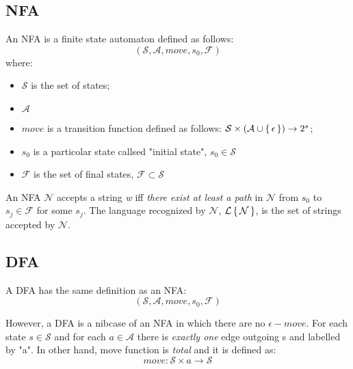 \subsection{NFA}

An NFA is a finite state automaton defined as follows:
\begin{equation}
(\mathcal{S} , \mathcal{A} , move , s_0 , \mathcal{F})
\end{equation}
where:
\begin{itemize}
\item $\mathcal{S}$ is the set of states;
\item $\mathcal{A}$
\item $move$ is a transition function defined as follows: $\mathcal{S} \times (\mathcal{A}\cup \set{\epsilon} ) \rightarrow 2^s$;
\item $s_0$ is a particolar state callsed "initial state", $s_0 \in \mathcal{S}$
\item $\mathcal{F}$ is the set of final states, $\mathcal{F} \subset \mathcal{S}$
\end{itemize}
\newline
An NFA $\mathcal{N}$ accepts a string \textit{w} iff \textit{there exist at least a path} in $\mathcal{N}$ from $s_0$ to $s_j \in \mathcal{F}$ for some $s_j$. The language recognized by $\mathcal{N}$, $\mathcal{L\set{N}}$, is the set of strings accepted by $\mathcal{N}$.

\subsection{DFA}

A DFA has the same definition as an NFA:
\begin{equation}
(\mathcal{S} , \mathcal{A} , move , s_0 , \mathcal{F})
\end{equation}

However, a DFA is a nibcase of an NFA in which there are no $\epsilon-move$.
For each state $s \in \mathcal{S}$ and for each $a \in \mathcal{A}$ there is \textit{exactly one} edge outgoing s and labelled by "a". In other hand, move function is \textit{total} and it is defined as:
\begin{equation}
move: \mathcal{S} \times a \rightarrow \mathcal{S}
\end{equation}











